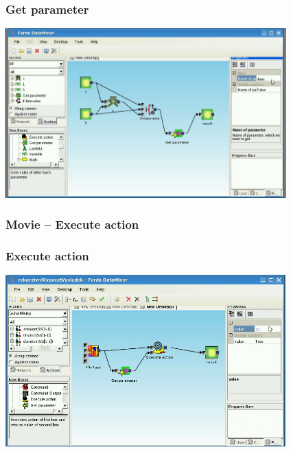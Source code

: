 \documentclass{beamer}
\begin{document}
\begin{frame}
	\frametitle{Get parameter}
	\includegraphics[width=10.8cm]{getParameter2.png}
\end{frame}

\begin{frame}
	\frametitle{Movie -- Execute action}
\end{frame}

\begin{frame}
	\frametitle{Execute action}
	\includegraphics[width=10.8cm]{executeAction2.png}
\end{frame}
\end{document}
